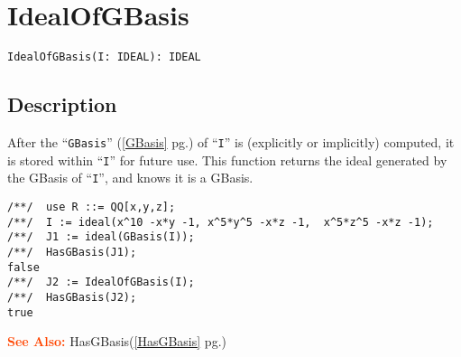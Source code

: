 \documentclass[a4paper]{mybook}
\newenvironment{command}{}{} %
\newcommand\SeeAlso{\par\textcolor{OrangeRed}{\textbf{\large See Also: }}}
\begin{document}
\section{IdealOfGBasis}
\label{IdealOfGBasis}
\begin{command} %


\begin{Verbatim}[label=syntax, rulecolor=\color{MidnightBlue},
frame=single]
IdealOfGBasis(I: IDEAL): IDEAL
\end{Verbatim}


\subsection*{Description}

After the ``\verb&GBasis&'' (\ref{GBasis} pg.\pageref{GBasis}) of ``\verb&I&'' is (explicitly or implicitly)
computed, it is stored within ``\verb&I&'' for future use.
This function returns the ideal generated by the GBasis of ``\verb&I&'',
and knows it is a GBasis.
\begin{Verbatim}[label=example, rulecolor=\color{PineGreen}, frame=single]
/**/  use R ::= QQ[x,y,z];
/**/  I := ideal(x^10 -x*y -1, x^5*y^5 -x*z -1,  x^5*z^5 -x*z -1);
/**/  J1 := ideal(GBasis(I));
/**/  HasGBasis(J1);
false
/**/  J2 := IdealOfGBasis(I);
/**/  HasGBasis(J2);
true
\end{Verbatim}


\SeeAlso %
  HasGBasis(\ref{HasGBasis} pg.\pageref{HasGBasis})
\end{command} %
\end{document}
